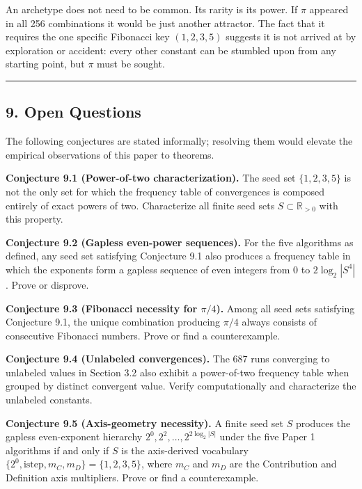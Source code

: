 \documentclass[
  11pt,
  letterpaper,
]{article}
\begin{document}
An archetype does not need to be common. Its rarity is its power. If
\(\pi\) appeared in all 256 combinations it would be just another
attractor. The fact that it requires the one specific Fibonacci key
\((1, 2, 3, 5)\) suggests it is not arrived at by exploration or
accident: every other constant can be stumbled upon from any starting
point, but \(\pi\) must be sought.

\begin{center}\rule{0.5\linewidth}{0.5pt}\end{center}

\subsection{9. Open Questions}\label{open-questions}

The following conjectures are stated informally; resolving them would
elevate the empirical observations of this paper to theorems.

\textbf{Conjecture 9.1 (Power-of-two characterization).} The seed set
\(\{1, 2, 3, 5\}\) is not the only set for which the frequency table of
convergences is composed entirely of exact powers of two. Characterize
all finite seed sets \(S \subset \mathbb{R}_{>0}\) with this property.

\textbf{Conjecture 9.2 (Gapless even-power sequences).} For the five
algorithms as defined, any seed set satisfying Conjecture 9.1 also
produces a frequency table in which the exponents form a gapless
sequence of even integers from 0 to \(2\log_2|S^4|\). Prove or disprove.

\textbf{Conjecture 9.3 (Fibonacci necessity for \(\pi/4\)).} Among all
seed sets satisfying Conjecture 9.1, the unique combination producing
\(\pi/4\) always consists of consecutive Fibonacci numbers. Prove or
find a counterexample.

\textbf{Conjecture 9.4 (Unlabeled convergences).} The 687 runs
converging to unlabeled values in Section 3.2 also exhibit a
power-of-two frequency table when grouped by distinct convergent value.
Verify computationally and characterize the unlabeled constants.

\textbf{Conjecture 9.5 (Axis-geometry necessity).} A finite seed set
\(S\) produces the gapless even-exponent hierarchy
\(2^0, 2^2, \ldots, 2^{2\log_2|S|}\) under the five Paper 1 algorithms
if and only if \(S\) is the axis-derived vocabulary
\(\{2^0, \mathrm{istep}, m_C, m_D\} = \{1, 2, 3, 5\}\), where \(m_C\)
and \(m_D\) are the Contribution and Definition axis multipliers. Prove
or find a counterexample.
\end{document}
